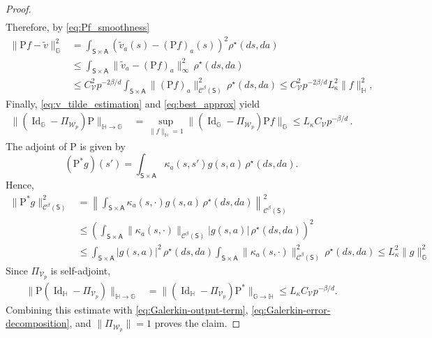 \documentclass{article}
\theoremstyle{definition}
\theoremstyle{remark}
\theoremstyle{plain}
\newcommand{\MKQ}{\mathrm{P}}
\def\eqsp{\,}
\newcommand{\dsieve}{p}
\numberwithin{equation}{section}
\begin{document}
\begin{proof}
\begin{align}
\end{align}
Therefore, by \eqref{eq:Pf_smoothness}
\begin{align}
\label{eq:v_tilde_estimation}
    \|\MKQ f - \tilde v\|_{\mathbb{G}}^2 &= \int_{\mathsf{S}\times\mathsf{A}} (\tilde v_a(s) - (\MKQ f)_a(s))^2\rho^\star(ds, da)\\
    &\le \int_{\mathsf{S}\times\mathsf{A}} \|\tilde v_a - (\MKQ f)_a\|_{\infty}^2\,\rho^\star(ds, da)\\
    &\le C_{\mathcal V}^2
        \dsieve^{-2\beta/d} \int_{\mathsf{S}\times\mathsf{A}}\|(\MKQ f)_a\|_{\mathcal{C}^{\beta}(\mathsf{S})}^2\,\rho^\star(ds, da) \le  C_{\mathcal V}^2
        \dsieve^{-2\beta/d}
L_{\mathrm{\kappa}}^2\| f\|_{\mathbb H}^2,
\end{align}
Finally, \eqref{eq:v_tilde_estimation} and \eqref{eq:best_approx} yield 
\begin{align}
\label{eq:Galerkin-output-term}
    \|(\operatorname{Id}_{\mathbb G}
      -\Pi_{\mathcal W_{\dsieve}})\MKQ\|_{\mathbb H\to\mathbb G}
      &= \sup_{\|f\|_{\mathbb H} = 1} \|(\operatorname{Id}_{\mathbb{G}} - \Pi_{\mathcal{W}_\dsieve})\MKQ f\|_{\mathbb{G}} \le L_{{\kappa}} C_{\mathcal V}
        \dsieve^{-\beta/d}\eqsp.
\end{align}
The adjoint of \(\MKQ\) is given by
\[
    (\MKQ^\ast g)(s')
    =
    \int_{\mathsf S\times\mathsf A}
    \kappa_a(s,s')g(s,a)\,\rho^\star(ds,da).
\]
Hence,
\begin{align}
    \|\MKQ^\ast g\|^2_{\mathcal C^\beta(\mathsf S)}& = \left\|\int_{\mathsf S\times\mathsf A}
\kappa_a(s,\cdot)g(s,a)\,\rho^\star(ds,da)\right\|_{\mathcal C^\beta(\mathsf S)}^2
\\
&\le \left(\int_{\mathsf S\times\mathsf A}
\|\kappa_a(s,\cdot)\|_{\mathcal C^\beta(\mathsf S)}|g(s,a)|\,\rho^\star(ds,da)\right)^2\\
&\le \int_{\mathsf S\times\mathsf A}
|g(s,a)|^2\,\rho^\star(ds,da) \int_{\mathsf S\times\mathsf A}
\|\kappa_a(s,\cdot)\|_{\mathcal C^\beta(\mathsf S)}^2\,\rho^\star(ds,da)
\le L_{\kappa}^2\|g\|_{\mathbb G}^2
\end{align}
Since \(\Pi_{\mathcal V_{\dsieve}}\) is self-adjoint,
\begin{align}
    \|\MKQ
      (\operatorname{Id}_{\mathbb H}
       -\Pi_{\mathcal V_{\dsieve}})\|_{\mathbb H\to\mathbb G}
    &=
    \|(\operatorname{Id}_{\mathbb H}
       -\Pi_{\mathcal V_{\dsieve}})
      \MKQ^\ast\|_{\mathbb G\to\mathbb H}
    \leq
    L_{\kappa} C_{\mathcal V}
    \dsieve^{-\beta/d}.
\end{align}
Combining this estimate with
\eqref{eq:Galerkin-output-term},
\eqref{eq:Galerkin-error-decomposition}, and
\(\|\Pi_{\mathcal W_{\dsieve}}\|=1\) proves the claim.
\end{proof}
\end{document}
